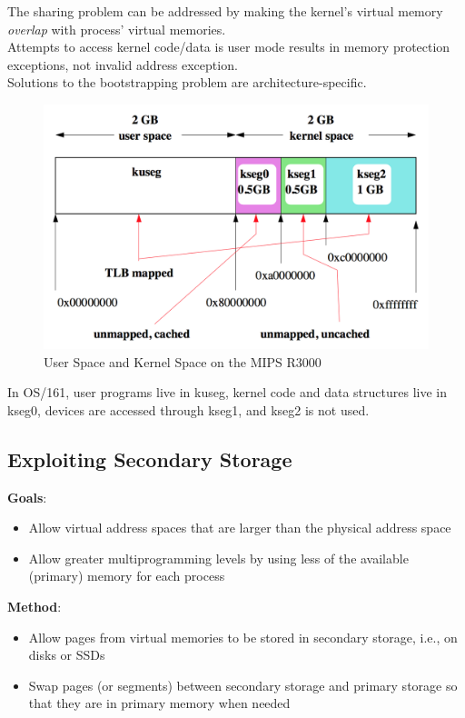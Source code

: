 \documentclass[12pt]{article}
\theoremstyle{plain}
\theoremstyle{definition}
\begin{document}
The sharing problem can be addressed by making the kernel's virtual memory \emph{overlap} with process' virtual memories. \\
Attempts to access kernel code/data is user mode results in memory protection exceptions, not invalid address exception. \\

Solutions to the bootstrapping problem are architecture-specific.

\begin{figure}[H]
  \centering
  \includegraphics[scale=0.5]{pictures/user_kernel_space_mips.png}
  \caption{User Space and Kernel Space on the MIPS R3000}
  \label{fig:mips_space}
\end{figure}

In OS/161, user programs live in kuseg, kernel code and data structures live in kseg0, devices are accessed through kseg1, and kseg2 is not used.

\subsection{Exploiting Secondary Storage}
\textbf{Goals}:
\begin{itemize}
  \item Allow virtual address spaces that are larger than the physical address space
  \item Allow greater multiprogramming levels by using less of the available (primary) memory for each process
\end{itemize}

\textbf{Method}:
\begin{itemize}
  \item Allow pages from virtual memories to be stored in secondary storage, i.e., on disks or SSDs
  \item Swap pages (or segments) between secondary storage and primary storage so that they are in primary memory when needed
\end{itemize}
\end{document}
